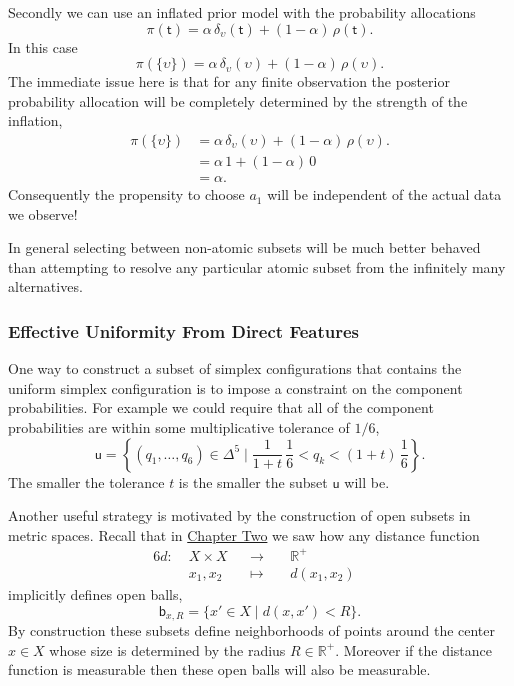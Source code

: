 \documentclass[
  letterpaper,
  DIV=11,
  numbers=noendperiod]{scrartcl}
\begin{document}
Secondly we can use an inflated prior model with the probability
allocations \[
\pi( \mathsf{t} ) =
  \alpha \, \delta_{ \upsilon }( \mathsf{t} )
+ (1 - \alpha) \, \rho( \mathsf{t} ).
\] In this case \[
\pi( \{ \upsilon \})
=
\alpha \, \delta_{ \upsilon }( \upsilon ) + (1 - \alpha) \, \rho( \upsilon ).
\] The immediate issue here is that for any finite observation the
posterior probability allocation will be completely determined by the
strength of the inflation, \begin{align*}
\pi( \{ \upsilon \})
&=
\alpha \, \delta_{ \upsilon }( \upsilon ) + (1 - \alpha) \, \rho( \upsilon ).
\\
&=
\alpha \, 1 + (1 - \alpha) \, 0
\\
&=
\alpha.
\end{align*} Consequently the propensity to choose \(a_{1}\) will be
independent of the actual data we observe!

In general selecting between non-atomic subsets will be much better
behaved than attempting to resolve any particular atomic subset from the
infinitely many alternatives.

\subsubsection{Effective Uniformity From Direct
Features}\label{sec:effective_direct}

One way to construct a subset of simplex configurations that contains
the uniform simplex configuration is to impose a constraint on the
component probabilities. For example we could require that all of the
component probabilities are within some multiplicative tolerance of
\(1/6\), \[
\mathsf{u} =
\left\{ (q_{1}, \ldots, q_{6}) \in \Delta^{5} \mid
        \frac{1}{1 + t} \, \frac{1}{6}
        < q_{k} <
        (1 + t) \, \frac{1}{6} \right\}.
\] The smaller the tolerance \(t\) is the smaller the subset
\(\mathsf{u}\) will be.

Another useful strategy is motivated by the construction of open subsets
in metric spaces. Recall that in
\href{https://betanalpha.github.io/assets/chapters_html/spaces.html}{Chapter
Two} we saw how any distance function \begin{alignat*}{6}
d :\; & X \times X & &\rightarrow& \; & \mathbb{R}^{+} &
\\
& x_{1}, x_{2} & &\mapsto& & d(x_{1}, x_{2}) &
\end{alignat*} implicitly defines open balls, \[
\mathsf{b}_{x, R}
=
\{ x' \in X \mid d(x, x') < R \}.
\] By construction these subsets define neighborhoods of points around
the center \(x \in X\) whose size is determined by the radius
\(R \in \mathbb{R}^{+}\). Moreover if the distance function is
measurable then these open balls will also be measurable.
\end{document}
